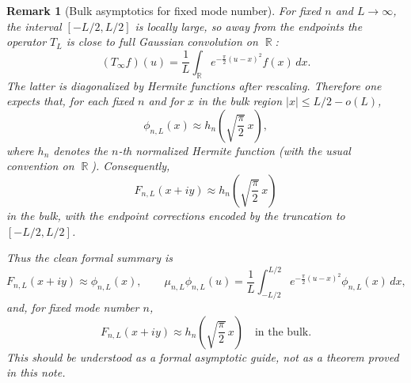 \documentclass[a4paper,11pt,reqno]{amsart}
\newtheorem{remark}{Remark}[section]
\DeclareMathOperator{\R}{\mathbb{R}}
\begin{document}
\begin{remark}[Bulk asymptotics for fixed mode number]
For fixed $n$ and $L\to\infty$, the interval $[-L/2,L/2]$ is locally large, so
away from the endpoints the operator $T_L$ is close to full Gaussian convolution
on $\R$:
\[
(T_\infty f)(u)=\frac1L\int_{\R}e^{-\frac{\pi}{2}(u-x)^2}f(x)\,dx.
\]
The latter is diagonalized by Hermite functions after rescaling. Therefore one
expects that, for each fixed $n$ and for $x$ in the bulk region
$|x|\le L/2-o(L)$,
\[
\phi_{n,L}(x)\approx h_n\!\left(\sqrt{\frac{\pi}{2}}\,x\right),
\]
where $h_n$ denotes the $n$-th normalized Hermite function (with the usual
convention on $\R$). Consequently,
\[
F_{n,L}(x+iy)\approx h_n\!\left(\sqrt{\frac{\pi}{2}}\,x\right)
\]
in the bulk, with the endpoint corrections encoded by the truncation to
$[-L/2,L/2]$.

Thus the clean formal summary is
\[
\boxed{
F_{n,L}(x+iy)\approx \phi_{n,L}(x),
\qquad
\mu_{n,L}\phi_{n,L}(u)=\frac1L\int_{-L/2}^{L/2}
e^{-\frac{\pi}{2}(u-x)^2}\phi_{n,L}(x)\,dx,
}
\]
and, for fixed mode number $n$,
\[
\boxed{
F_{n,L}(x+iy)\approx h_n\!\left(\sqrt{\frac{\pi}{2}}\,x\right)
\quad\text{in the bulk.}
}
\]
This should be understood as a formal asymptotic guide, not as a theorem proved
in this note.
\end{remark}
\end{document}
